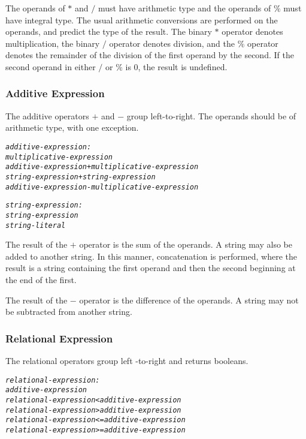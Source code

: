 \documentclass[12pt]{report}
\begin{document}
The operands of $*$ and $/$ must have arithmetic type and the operands of $\%$ must have integral type. The usual arithmetic conversions are performed on the operands, and predict the type of the result.
The binary $*$ operator denotes multiplication, the binary $/$ operator denotes division, and the $\%$ operator denotes the remainder of the division of the first operand by the second. If the second operand in either $/$ or $\%$ is $0$, the result is undefined. 

\subsubsection{Additive Expression}

The additive operators $+$ and $-$ group left-to-right. The operands should be of arithmetic type, with  one exception.

\begin{alltt}\begin{singlespace}
         \textit{additive-expression:}
              \textit{multiplicative-expression}
              \textit{additive-expression + multiplicative-expression}
              \textit{string-expression + string-expression}
              \textit{additive-expression - multiplicative-expression}
              
         \textit{string-expression:}
              \textit{string-expression}
              \textit{string-literal}\end{singlespace}
\end{alltt}

The result of the $+$ operator is the sum of the operands. A string may also be added to another string. In this manner, concatenation is performed, where the result is a string containing the first operand and then the second beginning at the end of the first.

The result of the $-$ operator is the difference of the operands. A string may not be subtracted from another string.

\subsubsection{Relational Expression}

The relational operators group left -to-right and returns booleans.

\begin{alltt}\begin{singlespace}
         \textit{relational-expression:}
              \textit{additive-expression}
              \textit{relational-expression < additive-expression}
              \textit{relational-expression > additive-expression}
              \textit{relational-expression <= additive-expression}
              \textit{relational-expression >= additive-expression}\end{singlespace}
\end{alltt}
\end{document}
